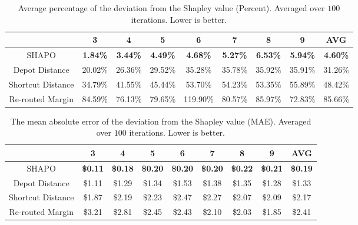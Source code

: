 \documentclass[sigconf]{aamas}
\begin{document}
\bgroup
\setlength{\tabcolsep}{0.7em}
\begin{table}
\centering
\begin{tabular}{ c|c c c c c c c c } 
\hline
 & 3 & 4 & 5 & 6 & 7 & 8 & 9 & AVG\\%
\hline
SHAPO & \textbf{1.84\%} & \textbf{3.44\%} & \textbf{4.49\%} & \textbf{4.68\%} & \textbf{5.27\%} & \textbf{6.53\%} & \textbf{5.94\%} & \textbf{4.60\%}\\
Depot Distance & 20.02\% & 26.36\% & 29.52\% & 35.28\% & 35.78\% & 35.92\% & 35.91\% & 31.26\%\\
Shortcut Distance & 34.79\% & 41.55\% & 45.44\% & 53.70\% & 54.23\% & 53.35\% & 55.89\% & 48.42\%\\
Re-routed Margin & 84.59\% & 76.13\% & 79.65\% & 119.90\% & 80.57\% & 85.97\% & 72.83\% & 85.66\%\\
\hline
\end{tabular}
\caption{Average percentage of the deviation from the Shapley value (Percent). Averaged over $100$ iterations. Lower is better.}
\label{tab:percentTable}
\end{table}
\egroup

\bgroup
\setlength{\tabcolsep}{1em}
\begin{table}
\centering
\begin{tabular}{ c|c c c c c c c c } 
\hline
 & 3 & 4 & 5 & 6 & 7 & 8 & 9 & AVG\\
\hline
SHAPO & \textbf{\$0.11} & \textbf{\$0.18} & \textbf{\$0.20} & \textbf{\$0.20} & \textbf{\$0.20} & \textbf{\$0.22} & \textbf{\$0.21} & \textbf{\$0.19}\\
Depot Distance & \$1.11 & \$1.29 & \$1.34 & \$1.53 & \$1.38 & \$1.35 & \$1.28 & \$1.33\\
Shortcut Distance & \$1.87 & \$2.19 & \$2.23 & \$2.47 & \$2.27 & \$2.07 & \$2.09 & \$2.17\\
Re-routed Margin & \$3.21 & \$2.81 & \$2.45 & \$2.43 & \$2.10 & \$2.03 & \$1.85 & \$2.41\\
 \hline
\end{tabular}
\caption{The mean absolute error of the deviation from the Shapley value (MAE). Averaged over $100$ iterations. Lower is better.}
\label{tab:ABSTable}
\end{table}
\end{document}
